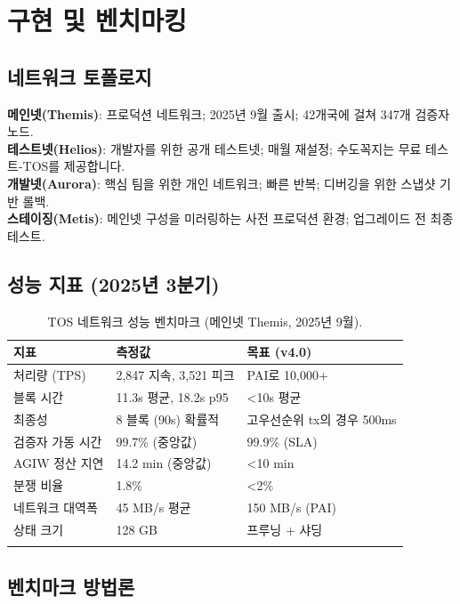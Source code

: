 \documentclass[11pt]{article}
\begin{document}
\section{구현 및 벤치마킹}
\label{sec:implementation}

\subsection{네트워크 토폴로지}

\textbf{메인넷(Themis)}: 프로덕션 네트워크; 2025년 9월 출시; 42개국에 걸쳐 347개 검증자 노드.\\
\textbf{테스트넷(Helios)}: 개발자를 위한 공개 테스트넷; 매월 재설정; 수도꼭지는 무료 테스트-TOS를 제공합니다.\\
\textbf{개발넷(Aurora)}: 핵심 팀을 위한 개인 네트워크; 빠른 반복; 디버깅을 위한 스냅샷 기반 롤백.\\
\textbf{스테이징(Metis)}: 메인넷 구성을 미러링하는 사전 프로덕션 환경; 업그레이드 전 최종 테스트.

\subsection{성능 지표 (2025년 3분기)}

\begin{longtable}{@{}p{}p{}p{}@{}}
\toprule
\textbf{지표} & \textbf{측정값} & \textbf{목표 (v4.0)} \\\midrule
처리량 (TPS) & 2,847 지속, 3,521 피크 & PAI로 10,000+ \\
블록 시간 & 11.3s 평균, 18.2s p95 & <10s 평균 \\
최종성 & 8 블록 (90s) 확률적 & 고우선순위 tx의 경우 500ms \\
검증자 가동 시간 & 99.7\% (중앙값) & 99.9\% (SLA) \\
AGIW 정산 지연 & 14.2 min (중앙값) & <10 min \\
분쟁 비율 & 1.8\% & <2\% \\
네트워크 대역폭 & 45 MB/s 평균 & 150 MB/s (PAI) \\
상태 크기 & 128 GB & 프루닝 + 샤딩 \\
\bottomrule
\caption{TOS 네트워크 성능 벤치마크 (메인넷 Themis, 2025년 9월).}
\end{longtable}

\subsection{벤치마크 방법론}
\end{document}

